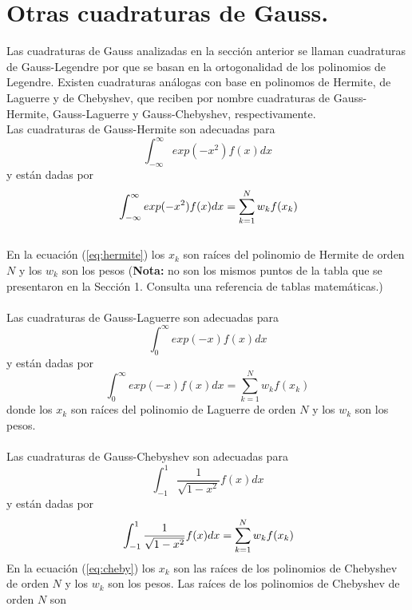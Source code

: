 \documentclass[12pt]{article}
\begin{document}
\section{Otras cuadraturas de Gauss.}
Las cuadraturas de Gauss analizadas en la sección anterior se llaman cuadraturas de Gauss-Legendre por que se basan en la ortogonalidad de los polinomios de Legendre. Existen cuadraturas análogas con base en polinomos de Hermite, de Laguerre y de Chebyshev, que reciben por nombre cuadraturas de Gauss-Hermite, Gauss-Laguerre y Gauss-Chebyshev, respectivamente.
\\
Las cuadraturas de Gauss-Hermite son adecuadas para
\begin{equation}
\int_{-\infty}^{\infty} exp(-x^{2}) f(x) dx
\end{equation}
y están dadas por
\begin{equation} {\label{eq:hermite}}
\int_{-\infty}^{\infty} exp(-x^{2}) f(x) dx = \sum_{k=1}^{N}w_{k}f(x_{k})
\end{equation}
\\
En la ecuación (\ref{eq:hermite}) los $x_{k}$ son raíces del polinomio de Hermite de orden $N$ y los $w_{k}$ son los pesos (\textbf{Nota:} no son los mismos puntos de la tabla que se presentaron en la Sección 1. Consulta una referencia de tablas matemáticas.)
\\
\\
Las cuadraturas de Gauss-Laguerre son adecuadas para
\begin{equation}
\int_{0}^{\infty} exp(-x) f(x) dx
\end{equation}
y están dadas por
\begin{equation}
\int_{0}^{\infty} exp(-x) f(x) dx = \sum_{k=1}^{N}w_{k}f(x_{k})
\end{equation}
donde los $x_{k}$ son raíces del polinomio de Laguerre de orden $N$ y los $w_{k}$ son los pesos.
\\
\\
Las cuadraturas de Gauss-Chebyshev son adecuadas para
\begin{equation}
\int_{-1}^{1} \dfrac{1}{\sqrt{1-x^{2}}} f(x) dx
\end{equation}
y están dadas por
\begin{equation} {\label{eq:cheby}}
\int_{-1}^{1} \dfrac{1}{\sqrt{1-x^{2}}} f(x) dx = \sum_{k=1}^{N} w_{k} f(x_{k})
\end{equation}
En la ecuación (\ref{eq:cheby}) los $x_{k}$ son las raíces de los polinomios de Chebyshev de orden $N$ y los $w_{k}$ son los pesos. Las raíces de los polinomios de Chebyshev de orden $N$ son
\end{document}
